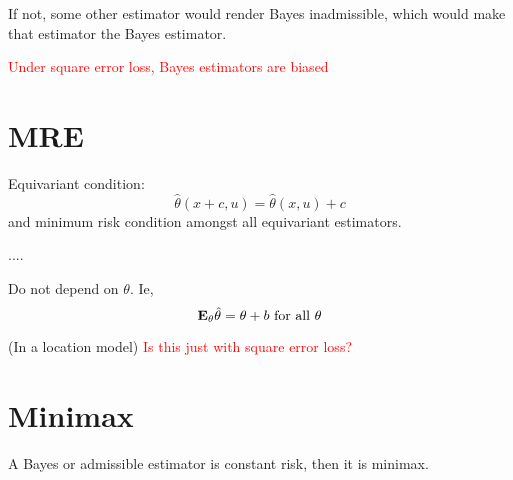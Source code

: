 \documentclass{article}
\newcommand\myworries[1]{\textcolor{red}{#1}}
\begin{document}
\begin{fact}
If not, some other estimator would render Bayes inadmissible, which would make that estimator the Bayes estimator.
\end{fact}

\begin{fact}
\myworries{Under square error loss, Bayes estimators are biased }
\end{fact}

\section{MRE}
\begin{definition}[MRE]
Equivariant condition: $$\hat \theta(x+c, u) = \hat \theta (x,u) + c$$
and minimum risk condition amongst all equivariant estimators. 
\end{definition}
\begin{fact}
.... 
\end{fact}
\begin{fact}
Do not depend on $\theta$. Ie, 
$$\mathbf{E}_\theta \hat \theta = \theta + b \text{ for all } \theta $$
\end{fact}
\begin{fact}
(In a location model)
\myworries{Is this just with square error loss?}

\end{fact}
\section{Minimax}
A Bayes or admissible estimator is constant risk, then it is minimax. 
\end{document}

